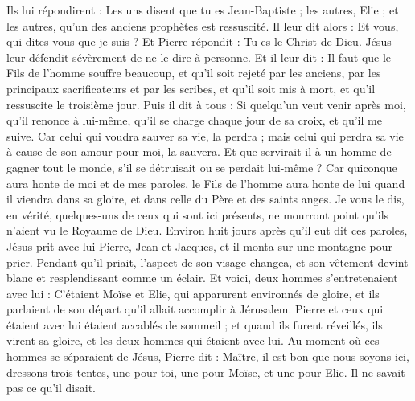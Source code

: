 \begin{multicols}{2}
{Ils lui répondirent : Les uns disent que tu es Jean-Baptiste ; les autres, Elie ; et les autres, qu’un des anciens prophètes est ressuscité.
Il leur dit alors : Et vous, qui dites-vous que je suis ? Et Pierre répondit : Tu es le Christ de Dieu.
Jésus leur défendit sévèrement de ne le dire à personne.
Et il leur dit : Il faut que le Fils de l'homme souffre beaucoup, et qu'il soit rejeté par les anciens, par les principaux sacrificateurs et par les scribes, et qu'il soit mis à mort, et qu'il ressuscite le troisième jour.
Puis il dit à tous : Si quelqu'un veut venir après moi, qu'il renonce à lui-même, qu'il se charge chaque jour de sa croix, et qu’il me suive.
Car celui qui voudra sauver sa vie, la perdra ; mais celui qui perdra sa vie à cause de son amour pour moi, la sauvera.
Et que servirait-il à un homme de gagner tout le monde, s'il se détruisait ou se perdait lui-même ?
Car quiconque aura honte de moi et de mes paroles, le Fils de l'homme aura honte de lui quand il viendra dans sa gloire, et dans celle du Père et des saints anges.
Je vous le dis, en vérité, quelques-uns de ceux qui sont ici présents, ne mourront point qu’ils n’aient vu le Royaume de Dieu.
Environ huit jours après qu’il eut dit ces paroles, Jésus prit avec lui Pierre, Jean et Jacques, et il monta sur une montagne pour prier.
Pendant qu’il priait, l’aspect de son visage changea, et son vêtement devint blanc et resplendissant comme un éclair.
Et voici, deux hommes s’entretenaient avec lui : C’étaient Moïse et Elie,
qui apparurent environnés de gloire, et ils parlaient de son départ qu'il allait accomplir à Jérusalem.
Pierre et ceux qui étaient avec lui étaient accablés de sommeil ; et quand ils furent réveillés, ils virent sa gloire, et les deux hommes qui étaient avec lui.
Au moment où ces hommes se séparaient de Jésus, Pierre dit : Maître, il est bon que nous soyons ici, dressons trois tentes, une pour toi, une pour Moïse, et une pour Elie. Il ne savait pas ce qu'il disait.
}
\end{multicols}
